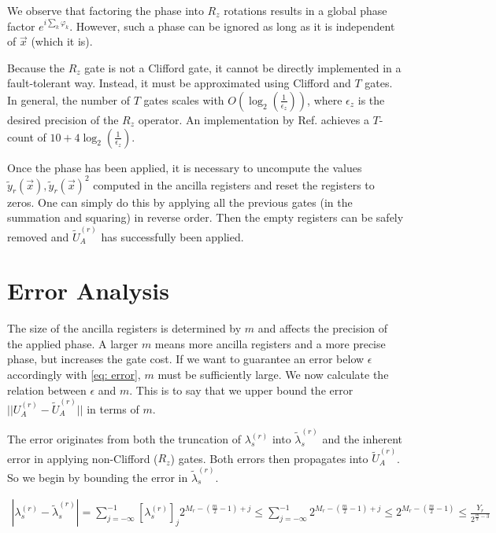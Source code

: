 We observe that factoring the phase into $R_z$ rotations results in a global phase factor $e^{i\sum_k \varphi_k}$. However, such a phase can be ignored as long as it is independent of $\vec{x}$ (which it is).

Because the $R_z$ gate is not a Clifford gate, it cannot be directly implemented in a fault-tolerant way. Instead, it must be approximated using Clifford and $T$ gates. In general, the number of $T$ gates scales with $O(\log_2(\frac{1}{\epsilon_z}))$, where $\epsilon_z$ is the desired precision of the $R_z$ operator. An implementation by Ref. \cite{Rz} achieves a $T$-count of $10 + 4\log_2(\frac{1}{\epsilon_z})$. 

Once the phase has been applied, it is necessary to uncompute the values $\tilde{y}_r(\vec{x}), \tilde{y}_r(\vec{x})^2$ computed in the ancilla registers and reset the registers to zeros. One can simply do this by applying all the previous gates (in the summation and squaring) in reverse order. Then the empty registers can be safely removed and $\tilde{U}_A^{(r)}$ has successfully been applied.

\section{Error Analysis}

The size of the ancilla registers is determined by $m$ and affects the precision of the applied phase. A larger $m$ means more ancilla registers and a more precise phase, but increases the gate cost. If we want to guarantee an error below $\epsilon$ accordingly with \eqref{eq: error}, $m$ must be sufficiently large. We now calculate the relation between $\epsilon$ and $m$. This is to say that we upper bound the error $||U_A^{(r)} - \tilde{U}_A^{(r)}||$ in terms of $m$.

The error originates from both the truncation of $\lambda^{(r)}_s$ into $\tilde{\lambda}^{(r)}_s$ and the inherent error in applying non-Clifford ($R_z$) gates. Both errors then propagates into $\tilde{U}_A^{(r)}$. So we begin by bounding the error in $\tilde{\lambda}^{(r)}_s$.

\begin{equation}
    \begin{split}
        |\lambda^{(r)}_s - \tilde{\lambda}^{(r)}_s| = \sum_{j = -\infty}^{-1} [\lambda^{(r)}_s]_j2^{M_r - (\frac{m}{2} - 1) + j} \leq \sum_{j = -\infty}^{-1} 2^{M_r - (\frac{m}{2} - 1) + j} \leq 2^{M_r - (\frac{m}{2} - 1)} \leq \frac{Y_r}{2^{\frac{m}{2} - 3}}
    \end{split}
\end{equation}

